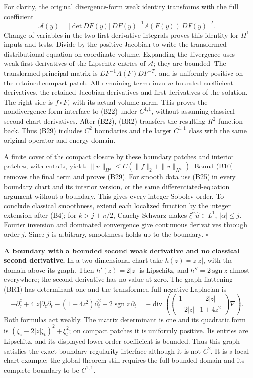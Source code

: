 \documentclass[
  11pt,
]{article}
\begin{document}
For clarity, the original divergence-form weak identity transforms with
the full coefficient \[
 \mathcal A(y)=|\det DF(y)|\,DF(y)^{-1}
                    A(F(y))\,DF(y)^{-T}.
 \tag{BR3}
\] Change of variables in the two first-derivative integrals proves this
identity for \(H^1\) inputs and tests. Divide by the positive Jacobian
to write the transformed distributional equation on coordinate volume.
Expanding the divergence uses weak first derivatives of the Lipschitz
entries of \(\mathcal A\); they are bounded. The transformed principal
matrix is \(DF^{-1}A(F)DF^{-T}\), and is uniformly positive on the
retained compact patch. All remaining terms involve bounded coefficient
derivatives, the retained Jacobian derivatives and first derivatives of
the solution. The right side is \(f\circ F\), with its actual volume
norm. This proves the nondivergence-form interface to (B22) under
\(C^{1,1}\), without assuming classical second chart derivatives. After
(B22), (BR2) transfers the resulting \(H^2\) function back. Thus (B29)
includes \(C^2\) boundaries and the larger \(C^{1,1}\) class with the
same original operator and energy domain.

A finite cover of the compact closure by these boundary patches and
interior patches, with cutoffs, yields
\(\|u\|_{H^2}\leq C(\|f\|_2+\|u\|_{H^1})\). Bound (B10) removes the
final term and proves (B29). For smooth data use (B25) in every boundary
chart and its interior version, or the same differentiated-equation
argument without a boundary. This gives every integer Sobolev order. To
conclude classical smoothness, extend each localized function by the
integer extension after (B4); for \(k>j+n/2\), Cauchy-Schwarz makes
\(\xi^\alpha\widehat u\in L^1\), \(|\alpha|\leq j\). Fourier inversion
and dominated convergence give continuous derivatives through order
\(j\). Since \(j\) is arbitrary, smoothness holds up to the boundary.
\(\square\)

\textbf{A boundary with a bounded second weak derivative and no
classical second derivative.} In a two-dimensional chart take
\(h(z)=z|z|\), with the domain above its graph. Then \(h'(z)=2|z|\) is
Lipschitz, and \(h''=2\operatorname{sgn}z\) almost everywhere; the
second derivative has no value at zero. The graph flattening (BR1) has
determinant one and the transformed full negative Laplacian is \[
 -\partial_z^2+4|z|\partial_z\partial_t
       -(1+4z^2)\partial_t^2
       +2\operatorname{sgn}z\,\partial_t
 =-\operatorname{div}\!
   \left(\begin{pmatrix}1&-2|z|\\-2|z|&1+4z^2\end{pmatrix}
                      \nabla\right).
 \tag{BR7}
\] Both formulas act weakly. The matrix determinant is one and its
quadratic form is \((\xi_z-2|z|\xi_t)^2+\xi_t^2\); on compact patches it
is uniformly positive. Its entries are Lipschitz, and its displayed
lower-order coefficient is bounded. Thus this graph satisfies the exact
boundary regularity interface although it is not \(C^2\). It is a local
chart example; the global theorem still requires the full bounded domain
and its complete boundary to be \(C^{1,1}\).
\end{document}
